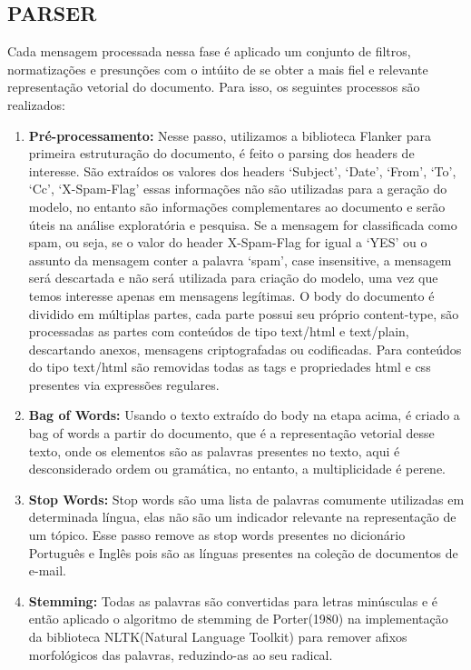 \documentclass[12pt,a4paper]{article}
\begin{document}
  
  \subsection{PARSER}
  Cada mensagem processada nessa fase é aplicado um conjunto de filtros, normatizações e presunções com o intúito de se obter a mais fiel e relevante representação vetorial do documento. Para isso, os seguintes processos são realizados:
  
  \begin{enumerate}
  \item \textbf{Pré-processamento:} Nesse passo, utilizamos a biblioteca Flanker para primeira estruturação do documento, é feito o parsing dos headers de interesse. São extraídos os valores dos headers ‘Subject’, ‘Date’, ‘From’, ‘To’, ‘Cc’, ‘X-Spam-Flag’ essas informações não são utilizadas para a geração do modelo, no entanto são informações complementares ao documento e serão úteis na análise exploratória e pesquisa. Se a mensagem for classificada como spam, ou seja, se o valor do header X-Spam-Flag for igual a ‘YES’ ou o assunto da mensagem conter a palavra ‘spam’, case insensitive, a mensagem será descartada e não será utilizada para criação do modelo, uma vez que temos interesse apenas em mensagens legítimas. O body do documento é dividido em múltiplas partes, cada parte possui seu próprio content-type, são processadas as partes com conteúdos de tipo text/html e text/plain, descartando anexos, mensagens criptografadas ou codificadas. Para conteúdos do tipo text/html são removidas todas as tags e propriedades html e css presentes via expressões regulares.
  \item \textbf{Bag of Words:} Usando o texto extraído do body na etapa acima, é criado a bag of words a partir do documento, que é a representação vetorial desse texto, onde os elementos são as palavras presentes no texto, aqui é desconsiderado ordem ou gramática, no entanto, a multiplicidade é perene.
  \item \textbf{Stop Words:} Stop words são uma lista de palavras comumente utilizadas em determinada língua, elas não são um indicador relevante na representação de um tópico. Esse passo remove as stop words presentes no dicionário Português e Inglês pois são as línguas presentes na coleção de documentos de e-mail.
  \item \textbf{Stemming:} Todas as palavras são convertidas para letras minúsculas e é então aplicado o algoritmo de stemming de Porter(1980) na implementação da biblioteca NLTK(Natural Language Toolkit)  para remover afixos morfológicos das palavras, reduzindo-as ao seu radical.
  

\end{enumerate}
\end{document}
